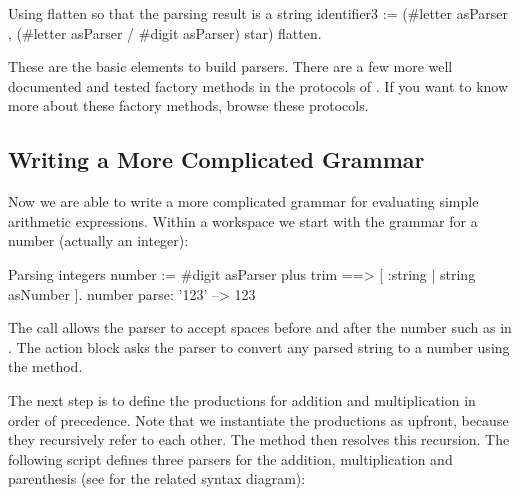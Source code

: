\documentclass[a4paper,10pt,twoside]{book}
\begin{document}
\begin{script}{Using flatten so that the parsing result is a string}
identifier3 := (#letter asParser , (#letter asParser / #digit asParser) star) flatten.
\end{script}

These are the basic elements to build parsers. There are a few more
well documented and tested factory methods in the 
protocols of . If you want to know more about these
factory methods, browse these protocols.

\subsection{Writing a More Complicated Grammar}

Now we are able to write a more complicated grammar for evaluating
simple arithmetic expressions. Within a workspace we start with the
grammar for a number (actually an integer):

\begin{script}[number]{Parsing integers}
number :=  #digit asParser plus trim ==> [ :string | string asNumber ].
number parse: '123'             --> 123
\end{script}


The  call allows the parser to accept spaces before and after
the number such as in . The action block asks the parser
to convert any parsed string to a number using the
 method.

The next step is to define the productions for addition and
multiplication in order of precedence. Note that we instantiate the
productions as  upfront, because they recursively
refer to each other. The method  then resolves this
recursion. The following script defines three parsers for the
addition, multiplication and parenthesis (see 
for the related syntax diagram):
\end{document}
